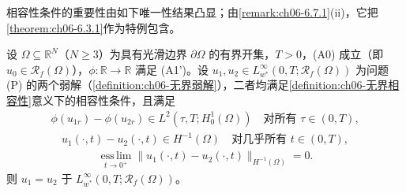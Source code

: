 \documentclass[../../main.tex]{subfiles}%
\begin{document}
相容性条件的重要性由如下唯一性结果凸显；由\cref{remark:ch06-6.7.1}(ii)，它把\cref{theorem:ch06-6.3.1}作为特例包含。

\begin{theorem}\label{theorem:ch06-6.7.2}
设 $\Omega\subseteq\mathbb{R}^N$（$N\geqslant3$）为具有光滑边界 $\partial\Omega$ 的有界开集，$T>0$，(A0) 成立（即 $u_0\in\mathscr{R}_f(\Omega)$），$\phi:\mathbb{R}\to\mathbb{R}$ 满足 (A1')。设 $u_1,u_2\in L^\infty_{w^*}(0,T;\mathscr{R}_f(\Omega))$ 为问题 (P) 的两个弱解（\cref{definition:ch06-无界弱解}），二者均满足\cref{definition:ch06-无界相容性}意义下的相容性条件，且满足
\begin{align}
\phi(u_{1r})-\phi(u_{2r})\in L^2(\tau,T;H^1_0(\Omega))\quad\text{对所有 }\tau\in(0,T), \label{align:ch6-6.138a}
\end{align}
\begin{align}
u_1(\cdot,t)-u_2(\cdot,t)\in H^{-1}(\Omega)\quad\text{对几乎所有 }t\in(0,T), \label{align:ch6-6.138b}
\end{align}
\begin{align}
\operatorname*{ess\,lim}_{t\to0^+}\|u_1(\cdot,t)-u_2(\cdot,t)\|_{H^{-1}(\Omega)}=0. \label{align:ch6-6.138c}
\end{align}
则 $u_1=u_2$ 于 $L^\infty_{w^*}(0,T;\mathscr{R}_f(\Omega))$。
\end{theorem}
\end{document}
